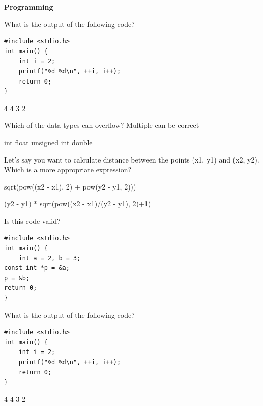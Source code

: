 \documentclass[12pt]{exam}
\begin{document}
\centering \large \textbf{Programming}
\normalsize
\begin{questions}


\question[1]What is the output of the following code?
\begin{lstlisting}
#include <stdio.h>
int main() {
	int i = 2;
	printf("%d %d\n", ++i, i++);
	return 0;
}
\end{lstlisting}
\begin{multicols}{2}
\begin{choices}	
 4
 4
 3
 2
\end{choices}
\end{multicols}

\question[1] Which of the data types can overflow? Multiple can be correct
\begin{multicols}{2}
\begin{choices}	
\choice int
\choice float
\choice unsigned int
\choice double
\end{choices}
\end{multicols}

\question[1] Let’s say you want to calculate distance between the points (x1, y1) and (x2, y2). Which is a more appropriate expression?
\begin{choices}	
\choice  sqrt(pow((x2 - x1), 2) + pow(y2 - y1, 2)))

\choice  (y2 - y1) * sqrt(pow((x2 - x1)/(y2 - y1), 2)+1)

\end{choices}

\question[1]  Is this code valid?
\begin{lstlisting}
#include <stdio.h>
int main() {
	int a = 2, b = 3;
const int *p = &a;
p = &b;
return 0;
} 
\end{lstlisting}
\fbox{
	\begin{minipage}{1.5cm}
		\hfill\vspace{3mm}
	\end{minipage}
	}

\question[1]What is the output of the following code?
\begin{lstlisting}
#include <stdio.h>
int main() {
	int i = 2;
	printf("%d %d\n", ++i, i++);
	return 0;
}
\end{lstlisting}
\begin{multicols}{2}
\begin{choices}	
 4
 4
 3
 2
\end{choices}
\end{multicols}


\end{questions}
\end{document}
